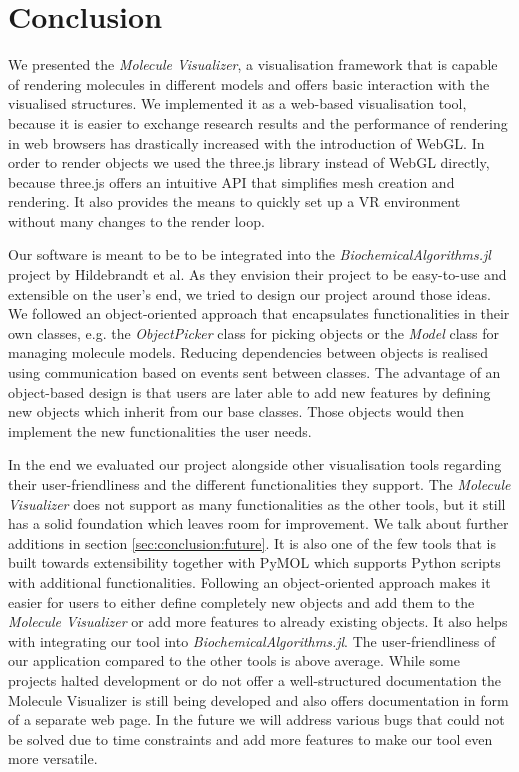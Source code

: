 %
\chapter{Conclusion}
\label{sec:conclusion}

We presented the \textit{Molecule Visualizer}, a visualisation framework that is capable of rendering molecules in different models and offers basic interaction with the visualised structures. We implemented it as a web-based visualisation tool, because it is easier to exchange research results and the performance of rendering in web browsers has drastically increased with the introduction of WebGL. In order to render objects we used the three.js library instead of WebGL directly, because three.js offers an intuitive API that simplifies mesh creation and rendering. It also provides the means to quickly set up a VR environment without many changes to the render loop. 

Our software is meant to be to be integrated into the \textit{BiochemicalAlgorithms.jl} project by Hildebrandt et al. As they envision their project to be easy-to-use and extensible on the user's end, we tried to design our project around those ideas. We followed an object-oriented approach that encapsulates functionalities in their own classes, e.g. the \textit{ObjectPicker} class for picking objects or the \textit{Model} class for managing molecule models. Reducing dependencies between objects is realised using communication based on events sent between classes. The advantage of an object-based design is that users are later able to add new features by defining new objects which inherit from our base classes. Those objects would then implement the new functionalities the user needs. 

In the end we evaluated our project alongside other visualisation tools regarding their user-friendliness and the different functionalities they support. The \textit{Molecule Visualizer} does not support as many functionalities as the other tools, but it still has a solid foundation which leaves room for improvement. We talk about further additions in section \ref{sec:conclusion:future}. It is also one of the few tools that is built towards extensibility together with PyMOL which supports Python scripts with additional functionalities. Following an object-oriented approach makes it easier for users to either define completely new objects and add them to the \textit{Molecule Visualizer} or add more features to already existing objects. It also helps with integrating our tool into \textit{BiochemicalAlgorithms.jl}. The user-friendliness of our application compared to the other tools is above average. While some projects halted development or do not offer a well-structured documentation the Molecule Visualizer is still being developed and also offers documentation in form of a separate web page. In the future we will address various bugs that could not be solved due to time constraints and add more features to make our tool even more versatile.

